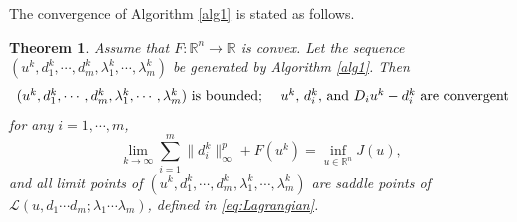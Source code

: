 \documentclass{article}
\newtheorem{theorem}{Theorem}
\theoremstyle{definition}
\begin{document}
The convergence of Algorithm \ref{alg1} is stated as follows.
\begin{theorem}
Assume that $F:\mathbb{R}^n\rightarrow \mathbb{R}$ is convex.
  Let the sequence $(u^k, d_1^k, \cdots, d_m^k, \lambda_1^k,\cdots,\lambda_m^k)$ be generated by Algorithm \ref{alg1}. Then
  \begin{equation}\label{eq:th3:1}
  \mbox{ $(u^k, d_1^k, \cdots, d_m^k, \lambda_1^k,\cdots,\lambda_m^k)$ is bounded; \quad $u^k$, $d_i^k$, and $D_iu^{k}-d_i^k$ are convergent}
  \end{equation}
  for any $i=1,\cdots, m$,
  \begin{equation}\label{eq:th3:2}
    \lim_{k\rightarrow\infty}\sum_{i=1}^{m}\|d_i^{k}\|_\infty^p + F(u^k)
    =\inf_{u\in\mathbb{R}^n}J(u),
  \end{equation}
  and all limit points of $(u^k, d_1^k, \cdots, d_m^k, \lambda_1^k,\cdots,\lambda_m^k)$ are saddle points of $\mathcal{L}(u,d_1\cdots d_m;\lambda_1\cdots \lambda_m)$, defined in \eqref{eq:Lagrangian}.
\end{theorem}
\end{document}
